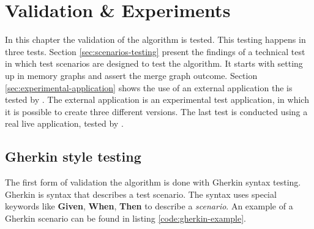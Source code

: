 \chapter{Validation \& Experiments}

In this chapter the validation of the algorithm is tested. This testing happens in three tests. Section \ref{sec:scenarios-testing} present the findings of a technical test in which test scenarios are designed to test the algorithm. It starts with setting up in memory graphs and assert the merge graph outcome. Section \ref{sec:experimental-application} shows the use of an external application the is tested by \testar. The external application is an experimental test application, in which it is possible to create three different versions. The last test is conducted using a real live application, tested by \testar. 






\newpage

\section{Gherkin style testing} 
The first form of validation the algorithm is done with Gherkin syntax testing. Gherkin is syntax that describes a test scenario. The syntax uses special keywords like \textbf{Given}, \textbf{When}, \textbf{Then} to describe a \textit{scenario}. An example of a Gherkin scenario can be found in listing \ref{code:gherkin-example}.


